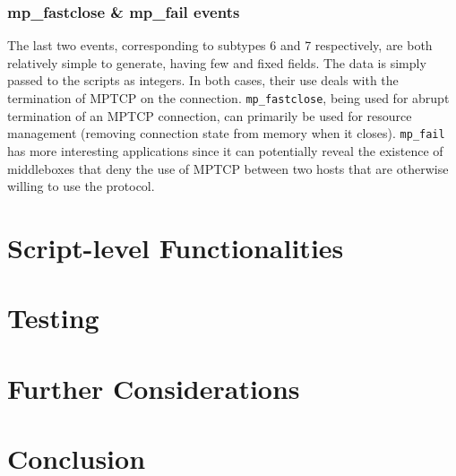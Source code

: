\documentclass[12pt, a4paper, oneside]{article} %
\begin{document}
\subsubsection{mp\_fastclose \& mp\_fail events}
The last two events, corresponding to subtypes 6 and 7 respectively, are both relatively simple to generate, having few and fixed fields. The data is simply passed to the scripts as integers. In both cases, their use deals with the termination of MPTCP on the connection. \texttt{mp\_fastclose}, being used for abrupt termination of an MPTCP connection, can primarily be used for resource management (removing connection state from memory when it closes). \texttt{mp\_fail} has more interesting applications since it can potentially reveal the existence of middleboxes that deny the use of MPTCP between two hosts that are otherwise willing to use the protocol.


\section{Script-level Functionalities}


\section{Testing}


\section{Further Considerations}


\section{Conclusion}




\pagestyle{fancy} %

\pagebreak
%
%
%
%
%
%
%
%
%
%
%
%
%
%
\end{document}
